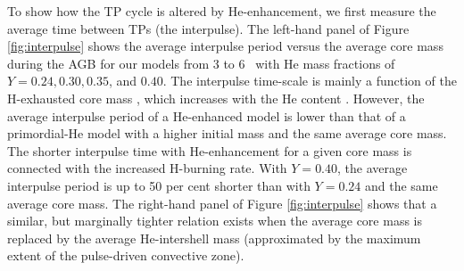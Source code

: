 To show how the TP cycle is altered by He-enhancement, we first measure the average time between TPs (the interpulse). The left-hand panel of Figure \ref{fig:interpulse} shows the average interpulse period versus the average core mass during the AGB for our models from 3 to 6 \Msun\ with He mass fractions of $Y=0.24,0.30,0.35$, and $0.40$. The interpulse time-scale is mainly a function of the H-exhausted core mass \citep{Paczynski:1974kf,ChristySackmann:1975ta}, which increases with the He content \citep{Becker:1979jk,Lattanzio:1986cz}. However, the average interpulse period of a He-enhanced model is lower than that of a primordial-He model with a higher initial mass and the same average core mass. The shorter interpulse time with He-enhancement for a given core mass is connected with the increased H-burning rate. With $Y=0.40$, the average interpulse period is up to 50 per cent shorter than with $Y=0.24$ and the same average core mass. The right-hand panel of Figure \ref{fig:interpulse} shows that a similar, but marginally tighter relation exists when the average core mass is replaced by the average He-intershell mass (approximated by the maximum extent of the pulse-driven convective zone).

